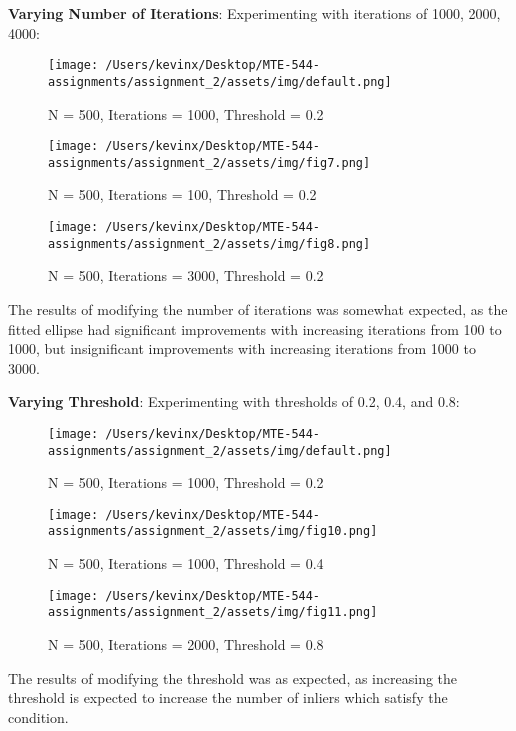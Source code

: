 \begin{enumerate}[a.)]
\textbf{Varying Number of Iterations}: Experimenting with iterations of 1000, 2000, 4000:
\begin{figure}[H] %
    \centering
    \texttt{[image: /Users/kevinx/Desktop/MTE-544-assignments/assignment\_2/assets/img/default.png]} %
    \caption{N = 500, Iterations = 1000, Threshold = 0.2}
    \label{fig:your_label}
\end{figure}
\begin{figure}[H] %
    \centering
    \texttt{[image: /Users/kevinx/Desktop/MTE-544-assignments/assignment\_2/assets/img/fig7.png]} %
    \caption{N = 500, Iterations = 100, Threshold = 0.2}
    \label{fig:your_label}
\end{figure}
\begin{figure}[H] %
    \centering
    \texttt{[image: /Users/kevinx/Desktop/MTE-544-assignments/assignment\_2/assets/img/fig8.png]} %
    \caption{N = 500, Iterations = 3000, Threshold = 0.2}
    \label{fig:your_label}
\end{figure}
The results of modifying the number of iterations was somewhat expected, as the fitted ellipse had significant improvements with increasing iterations from 100 to 1000, but insignificant improvements with increasing iterations from 1000 to 3000.

\textbf{Varying Threshold}: Experimenting with thresholds of 0.2, 0.4, and 0.8:
\begin{figure}[H] %
    \centering
    \texttt{[image: /Users/kevinx/Desktop/MTE-544-assignments/assignment\_2/assets/img/default.png]} %
    \caption{N = 500, Iterations = 1000, Threshold = 0.2}
    \label{fig:your_label}
\end{figure}
\begin{figure}[H] %
    \centering
    \texttt{[image: /Users/kevinx/Desktop/MTE-544-assignments/assignment\_2/assets/img/fig10.png]} %
    \caption{N = 500, Iterations = 1000, Threshold = 0.4}
    \label{fig:your_label}
\end{figure}
\begin{figure}[H] %
    \centering
    \texttt{[image: /Users/kevinx/Desktop/MTE-544-assignments/assignment\_2/assets/img/fig11.png]} %
    \caption{N = 500, Iterations = 2000, Threshold = 0.8}
    \label{fig:your_label}
\end{figure}
The results of modifying the threshold was as expected, as increasing the threshold is expected to increase the number of inliers which satisfy the condition.

\end{enumerate}